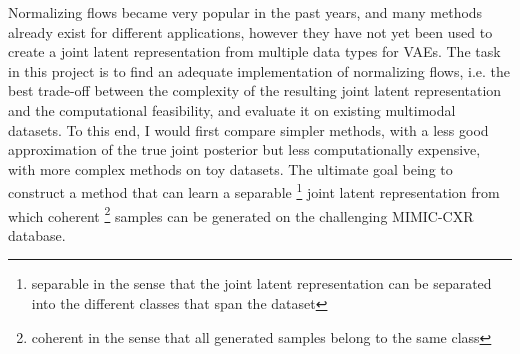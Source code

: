 Normalizing flows became very popular in the past years, and many methods already exist for different applications, however they have not yet been used to create a joint latent representation from multiple data types for VAEs.
The task in this project is to find an adequate implementation of normalizing flows, i.e. the best trade-off between the complexity of the resulting joint latent representation and the computational feasibility, and evaluate it on existing multimodal datasets.
To this end, I would first compare simpler methods, with a less good approximation of the true joint posterior but less computationally expensive, with more complex methods on toy datasets.
The ultimate goal being to construct a method that can learn a separable \footnote{separable in the sense that the joint latent representation can be separated into the different classes that span the dataset} joint latent representation from which coherent \footnote{coherent in the sense that all generated samples belong to the same class} samples can be generated on the challenging MIMIC-CXR \parencite{johnson_mimic-cxr-jpg_2019} database.